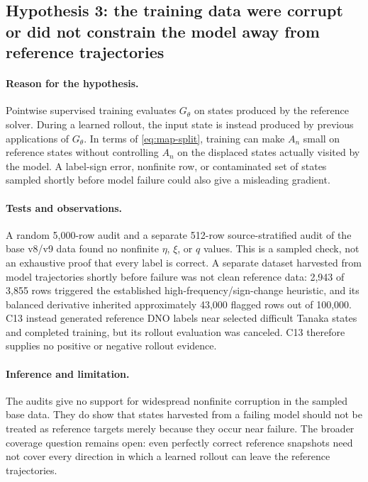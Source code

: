 \documentclass[11pt]{article}
\begin{document}
\subsection{Hypothesis 3: the training data were corrupt or did not constrain
the model away from reference trajectories}

\paragraph{Reason for the hypothesis.}
Pointwise supervised training evaluates $G_\theta$ on states produced by the
reference solver.  During a learned rollout, the input state is instead
produced by previous applications of $G_\theta$.  In terms of
\eqref{eq:map-split}, training can make $A_n$ small on reference states without
controlling $A_n$ on the displaced states actually visited by the model.  A
label-sign error, nonfinite row, or contaminated set of states sampled shortly
before model failure could also give a misleading gradient.

\paragraph{Tests and observations.}
A random 5,000-row audit and a separate 512-row source-stratified audit of the
base v8/v9 data found no nonfinite $\eta$, $\xi$, or $q$ values.  This is a
sampled check, not an exhaustive proof that every label is correct.  A
separate dataset harvested from model trajectories shortly before failure was
not clean reference data: 2,943 of 3,855 rows triggered the established
high-frequency/sign-change heuristic, and its balanced derivative inherited
approximately 43,000 flagged rows out of 100,000.  C13 instead generated
reference DNO labels near selected difficult Tanaka states and completed
training, but its rollout evaluation was canceled.  C13 therefore supplies no
positive or negative rollout evidence.

\paragraph{Inference and limitation.}
The audits give no support for widespread nonfinite corruption in the sampled
base data.  They do show that states harvested from a failing model should not
be treated as reference targets merely because they occur near failure.  The
broader coverage question remains open: even perfectly correct reference
snapshots need not cover every direction in which a learned rollout can leave
the reference trajectories.
\end{document}
